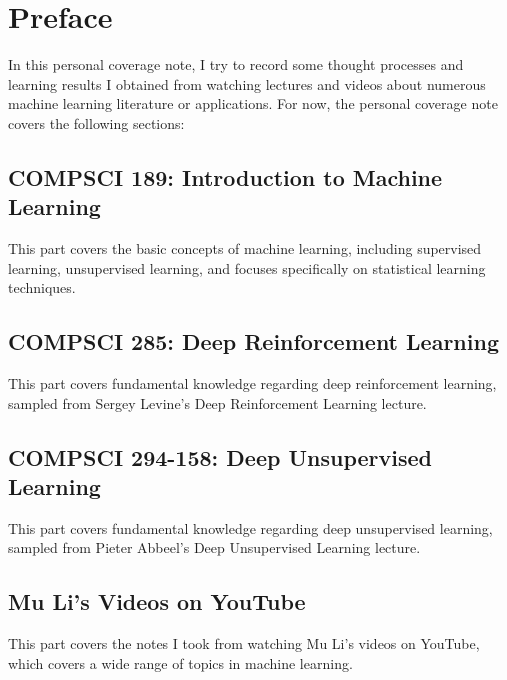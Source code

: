 \section{Preface}
In this personal coverage note, I try to record some thought processes and learning results I obtained from watching lectures and videos about numerous machine learning literature or applications.
For now, the personal coverage note covers the following sections:

\subsection{COMPSCI 189: Introduction to Machine Learning}
This part covers the basic concepts of machine learning, including supervised learning, unsupervised learning, and focuses specifically on statistical learning techniques.

\subsection{COMPSCI 285: Deep Reinforcement Learning}
This part covers fundamental knowledge regarding deep reinforcement learning, sampled from Sergey Levine's Deep Reinforcement Learning lecture.

\subsection{COMPSCI 294-158: Deep Unsupervised Learning}
This part covers fundamental knowledge regarding deep unsupervised learning, sampled from Pieter Abbeel's Deep Unsupervised Learning lecture.

\subsection{Mu Li's Videos on YouTube}
This part covers the notes I took from watching Mu Li's videos on YouTube, which covers a wide range of topics in machine learning.
